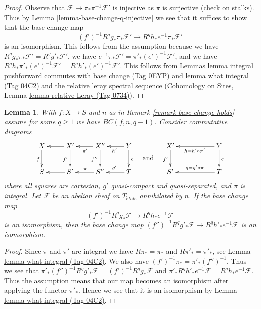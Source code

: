\documentclass{amsart}
\theoremstyle{plain}
\newtheorem{lemma}[subsection]{Lemma}
\theoremstyle{definition}
\theoremstyle{remark}
\numberwithin{equation}{subsection}
\def\etale{{\acute{e}tale}}
\begin{document}
\begin{proof}
Observe that $\mathcal{F} \to \pi_*\pi^{-1}\mathcal{F}'$ is injective
as $\pi$ is surjective (check on stalks). Thus by
Lemma \ref{lemma-base-change-q-injective}
we see that it suffices to show that the base change map
$$
(f')^{-1}R^qg_*\pi_*\mathcal{F}'
\longrightarrow
R^qh_*e^{-1}\pi_*\mathcal{F}'
$$
is an isomorphism. This follows from the assumption because
we have $R^qg_*\pi_*\mathcal{F}' = R^qg'_*\mathcal{F}'$,
we have $e^{-1}\pi_*\mathcal{F}' =\pi'_*(e')^{-1}\mathcal{F}'$, and
we have $R^qh_*\pi'_*(e')^{-1}\mathcal{F}' = R^qh'_*(e')^{-1}\mathcal{F}'$.
This follows from Lemmas
\href{https://stacks.math.columbia.edu/tag/0EYP}{lemma integral pushforward commutes with base change (Tag 0EYP)} and
\href{https://stacks.math.columbia.edu/tag/04C2}{lemma what integral (Tag 04C2)} and the relative leray spectral sequence
(Cohomology on Sites, Lemma \href{https://stacks.math.columbia.edu/tag/0734}{lemma relative Leray (Tag 0734)}).
\end{proof}


\begin{lemma}
\label{lemma-base-change-q-integral-bottom}
With $f : X \to S$ and $n$ as in Remark \ref{remark-base-change-holds}
assume for some $q \geq 1$ we have $BC(f, n, q - 1)$. Consider
commutative diagrams
$$
\vcenter{
\xymatrix{
X \ar[d]_f &
X' \ar[d]_{f'} \ar[l] &
X'' \ar[l]^{\pi'} \ar[d]_{f''} &
Y \ar[l]^{h'} \ar[d]^e \\
S &
S' \ar[l] &
S'' \ar[l]_\pi &
T \ar[l]_{g'}
}
}
\quad\text{and}\quad
\vcenter{
\xymatrix{
X' \ar[d]_{f'} & & Y \ar[ll]^{h = h' \circ \pi'} \ar[d]^e \\
S' & & T \ar[ll]_{g = g' \circ \pi}
}
}
$$
where all squares are cartesian, $g'$ quasi-compact and quasi-separated, and
$\pi$ is integral. Let $\mathcal{F}$ be an abelian sheaf
on $T_\etale$ annihilated by $n$. If the base change map
$$
(f')^{-1}R^qg_*\mathcal{F} \longrightarrow R^qh_*e^{-1}\mathcal{F}
$$
is an isomorphism, then the base change map
$(f'')^{-1}R^qg'_*\mathcal{F} \to R^qh'_*e^{-1}\mathcal{F}$
is an isomorphism.
\end{lemma}

\begin{proof}
Since $\pi$ and $\pi'$ are integral we have $R\pi_* = \pi_*$ and
$R\pi'_* = \pi'_*$, see Lemma \href{https://stacks.math.columbia.edu/tag/04C2}{lemma what integral (Tag 04C2)}.
We also have $(f')^{-1}\pi_* = \pi'_*(f'')^{-1}$. Thus we see that
$\pi'_*(f'')^{-1}R^qg'_*\mathcal{F} = (f')^{-1}R^qg_*\mathcal{F}$
and
$\pi'_*R^qh'_*e^{-1}\mathcal{F} = R^qh_*e^{-1}\mathcal{F}$.
Thus the assumption means that our map becomes an
isomorphism after applying the functor $\pi'_*$.
Hence we see that it is an isomorphism by Lemma \href{https://stacks.math.columbia.edu/tag/04C2}{lemma what integral (Tag 04C2)}.
\end{proof}
\end{document}

